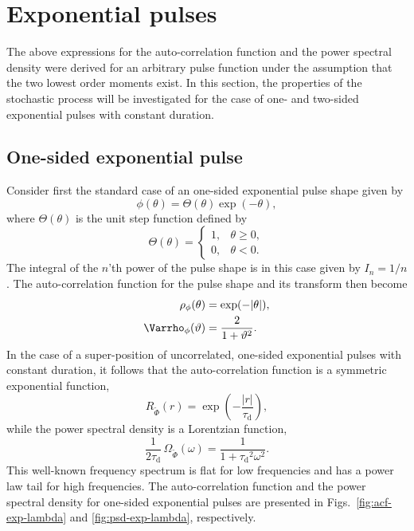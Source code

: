 \documentclass[aps,prb,12pt,a4paper,preprint,amsmath,amssymb,groupedaddress]{revtex4-1}
\newcommand{\abs}[1]{{\left|#1\right|}}\newcommand{\order}[1]{{\mathcal{O}\left(#1\right)}}
\newcommand{\taud}{\ensuremath{\tau_\text{d}}}
\newcommand{\Phiwt}{\ensuremath{\widetilde{\Phi}}}
\newcommand{\Figsref}[1]{Figs.~\ref{#1}}
\begin{document}
\section{Exponential pulses}\label{sec:phiexp}



The above expressions for the auto-correlation function and the power spectral density were derived for an arbitrary pulse function under the assumption that the two lowest order moments exist. In this section, the properties of the stochastic process will be investigated for the case of one- and two-sided exponential pulses with constant duration.



\subsection{One-sided exponential pulse}



Consider first the standard case of an one-sided exponential pulse shape given by\cite{garcia-prl,garcia-php,kube-php} %
\begin{equation}\label{phi-exp}
\phi(\theta) = \Theta(\theta)\exp(-\theta) ,
\end{equation}
where $\Theta(\theta)$ is the unit step function defined by
\begin{equation}\label{unitstep}
\Theta(\theta) =
\begin{cases}
1 , & \theta \geq 0 ,
\\
0 , & \theta < 0 .
\end{cases}
\end{equation}
The integral of the $n$'th power of the pulse shape is in this case given by $I_n=1/n$. The auto-correlation function for the pulse shape and its transform then become
\begin{subequations}\label{rhovar-exp}
\begin{align}%
\rho_\phi(\theta) & = \exp(-\abs{\theta}) ,\label{rhophi-exp}
\\
\Varrho_\phi(\vartheta) & = \frac{2}{1+\vartheta^2} .\label{varrhophi-exp}
\end{align}
\end{subequations}
In the case of a super-position of uncorrelated, one-sided exponential pulses with constant duration, it follows that the auto-correlation function is a symmetric exponential function,\cite{garcia-php,kube-php}
\begin{equation}\label{acf-exp}
R_{\Phiwt}(r) = \exp\left( - \frac{\abs{r}}{\taud} \right) ,
\end{equation}
while the power spectral density is a Lorentzian function,
\begin{equation}\label{psd-exp}
\frac{1}{2\taud}\,\Omega_{\Phiwt}(\omega) = \frac{1}{1+\taud^2\omega^2} .
\end{equation}
This well-known frequency spectrum is flat for low frequencies and has a power law tail for high frequencies. The auto-correlation function and the power spectral density for one-sided exponential pulses are presented in \Figsref{fig:acf-exp-lambda} and \ref{fig:psd-exp-lambda}, respectively.
\end{document}
